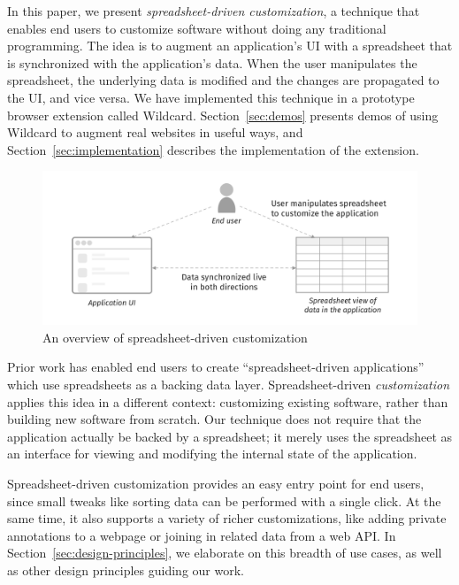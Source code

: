 \documentclass[english,submission]{programming}
\begin{document}
In this paper, we present \emph{spreadsheet-driven customization}, a
technique that enables end users to customize software without doing any
traditional programming. The idea is to augment an application's UI with
a spreadsheet that is synchronized with the application's data. When the
user manipulates the spreadsheet, the underlying data is modified and
the changes are propagated to the UI, and vice versa. We have
implemented this technique in a prototype browser extension called
Wildcard. Section~\ref{sec:demos} presents demos of using Wildcard to
augment real websites in useful ways, and
Section~\ref{sec:implementation} describes the implementation of the
extension.

\begin{figure}
\hypertarget{fig:overview}{%
\centering
\includegraphics{media/overview-300dpi.png}
\caption{An overview of spreadsheet-driven
customization}\label{fig:overview}
}
\end{figure}

Prior work \autocite{mccutchen2016,benson2014,chang2014} has enabled end
users to create ``spreadsheet-driven applications'' which use
spreadsheets as a backing data layer. Spreadsheet-driven
\emph{customization} applies this idea in a different context:
customizing existing software, rather than building new software from
scratch. Our technique does not require that the application actually be
backed by a spreadsheet; it merely uses the spreadsheet as an interface
for viewing and modifying the internal state of the application.

Spreadsheet-driven customization provides an easy entry point for end
users, since small tweaks like sorting data can be performed with a
single click. At the same time, it also supports a variety of richer
customizations, like adding private annotations to a webpage or joining
in related data from a web API. In Section~\ref{sec:design-principles},
we elaborate on this breadth of use cases, as well as other design
principles guiding our work.
\end{document}
